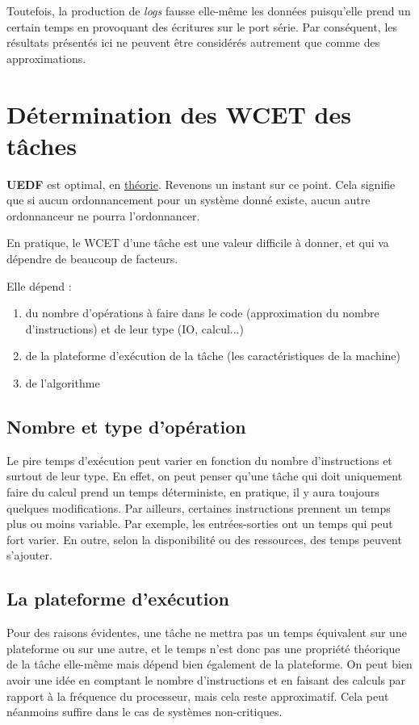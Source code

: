 	Toutefois, la production de \textit{logs}
	fausse elle-même les données puisqu'elle prend un certain temps en provoquant des écritures 
	sur le port série.
	Par conséquent, les résultats présentés ici ne peuvent 
	être considérés autrement que comme des approximations.

\section{Détermination des WCET des tâches}
	\textbf{UEDF} est optimal, en \underline{théorie}. Revenons un instant sur ce point. 
	Cela signifie que si aucun ordonnancement pour un système donné existe, 
	aucun autre ordonnanceur ne pourra l'ordonnancer.\newline

	En pratique, le WCET d'une tâche est une valeur difficile à donner, et qui va dépendre de 
	beaucoup de facteurs.\newline
	
	Elle dépend :
	\begin{enumerate}
		\item du nombre d'opérations à faire dans le code (approximation du nombre d'instructions) et de leur type (IO, calcul...)
		\item de la plateforme d'exécution de la tâche (les caractéristiques de la machine)
		\item de l'algorithme 
	\end{enumerate}
	
	\subsection{Nombre et type d'opération}
	Le pire temps d'exécution peut varier en fonction du nombre d'instructions et surtout de leur type. En effet, 
	on peut penser qu'une tâche qui doit uniquement faire du calcul prend un temps déterministe, en pratique, 
	il y aura toujours quelques modifications. \newline
	Par ailleurs, certaines instructions prennent un temps plus ou moins variable. Par exemple, 
	les entrées-sorties ont un temps qui peut fort varier. En outre, selon la disponibilité ou 
	des ressources, des temps peuvent s'ajouter. 
	
	\subsection{La plateforme d'exécution}
	Pour des raisons évidentes, une tâche ne mettra pas un temps équivalent sur une plateforme ou sur une autre, 
	et le temps n'est donc pas une propriété théorique de la tâche elle-même mais dépend bien 
	également de la plateforme. On peut bien avoir une idée en comptant le nombre d'instructions et en faisant 
	des calculs par rapport à la fréquence du processeur, mais cela reste approximatif. 
	Cela peut néanmoins suffire dans le cas de systèmes non-critiques.\newline
	
